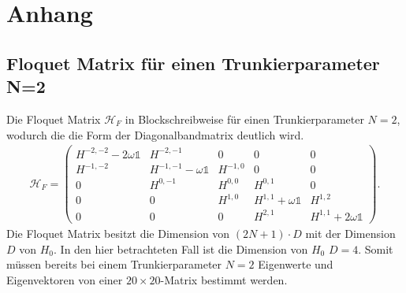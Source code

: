 \chapter{Anhang}
\section{Floquet Matrix für einen Trunkierparameter N=2}
\label{sec:H_f}
Die Floquet Matrix $\mathcal{H}_F$ in Blockschreibweise für
 einen Trunkierparameter $N=2$,
wodurch die die Form der Diagonalbandmatrix deutlich wird.
\begin{align}
   \mathcal{H}_F=\begin{pmatrix}
H^{-2,-2}-2\omega\mathbb{1} &          H^{-2 ,-1}         &     0     &        0                  &     0  \\
H^{-1,-2}                   &  H^{-1,-1}-\omega\mathbb{1} &  H^{-1,0} &        0                  &     0   \\
 0                          &          H^{0,-1}           &  H^{0,0}  &       H^{0,1}             &     0  \\
 0                          &              0              &  H^{1,0}  &  H^{1,1}+\omega\mathbb{1} &  H^{1,2}\\
 0                          &              0              &     0     &        H^{2,1}            & H^{1,1}+2\omega\mathbb{1}
\end{pmatrix}.
\end{align}
Die Floquet Matrix besitzt die Dimension von $(2N+1)\cdot D$ mit der Dimension $D$ von $H_0$.
In den hier betrachteten Fall ist die Dimension von $H_0$ $D=4$.
Somit müssen bereits bei einem Trunkierparameter $N=2$ Eigenwerte
 und Eigenvektoren
von einer $20\times20$-Matrix bestimmt werden.

\newpage
